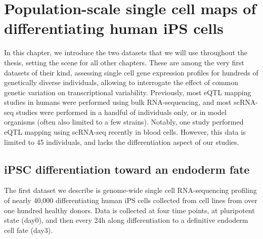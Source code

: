 
\chapter{Population-scale single cell maps of differentiating human iPS cells}

In this chapter, we introduce the two datasets that we will use throughout the thesis, setting the scene for all other chapters. 
These are among the very first datasets of their kind, assessing single cell gene expression profiles for hundreds of genetically diverse individuals, allowing to interrogate the effect of common genetic variation on transcriptional variability.
Previously, most eQTL mapping studies in humans were performed using bulk RNA-sequencing, and most scRNA-seq studies were performed in a handful of individuals only, or in model organisms (often also limited to a few strains).
Notably, one study performed eQTL mapping using scRNA-seq \cite{van2018single} recently in blood cells. 
However, this data is limited to 45 individuals, and lacks the differentiation aspect of our studies.

\section{iPSC differentiation toward an endoderm fate}

The first dataset we describe is genome-wide single cell RNA-sequencing profiling of nearly 40,000 differentiating human iPS cells collected from cell lines from over one hundred healthy donors. 
Data is collected at four time points, at pluripotent state (day0), and then every 24h along differentiation to a definitive endoderm cell fate (day3).

\newpage

